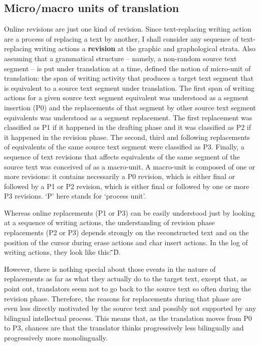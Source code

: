 \subsection{Micro/macro units of translation}
\label{sec:MicroMacro}

Online revisions are just one kind of revision.  Since text-replacing writing action are a process of replacing a text by another, I shall consider any sequence of text-replacing writing actions a \textbf{revision} at the graphic and graphological strata. Also assuming that a grammatical structure -- namely, a non-random source text segment -- is put under translation at a time, \citet{Alves:2009js,Alves:2011vj} defined the notion of micro-unit of translation: the span of writing activity that produces a target text segment that is equivalent to a source text segment under translation.
The first span of writing actions for a given source text segment equivalent was understood as a segment insertion (P0) and the replacements of that segment by other source text segment equivalents was understood as a segment replacement. The first replacement was classified as P1 if it happened in the drafting phase and it was classified as P2 if it happened in the revision phase. The second, third and following replacements of equivalents of the same source text segment were classified as P3. Finally, a sequence of text revisions that affects equivalents of the same segment of the source text was conceived of as a macro-unit. A macro-unit is composed of one or more revisions: it contains necessarily a P0 revision, which is either final or followed by a P1 or P2 revision, which is either final or followed by one or more P3 revisions. `P' here stands for `process unit'.

Whereas online replacements (P1 or P3) can be easily understood just by looking at a sequence of writing actions, the understanding of revision phase replacements (P2 or P3) depends strongly on the reconstructed text and on the position of the cursor during erase actions and char insert actions. In the log of writing actions, they look like this: \={ }\uettl\={ }\uettl\u{ }D\={ }.

However, there is nothing special about those events in the nature of replacements as far as what they actually do to the target text, except that, as \citet{Alves:2011vj} point out, translators seem not to go back to the source text so often during the revision phase. Therefore, the reasons for replacements during that phase are even less directly motivated by the source text and possibly not supported by any bilingual intellectual process. This means that, as the translation moves from P0 to P3, chances are that the translator thinks progressively less bilingually and progressively more monolingually.

